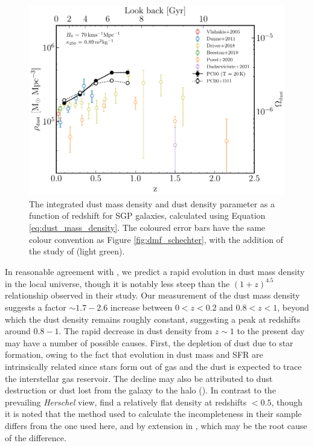 \begin{figure}
	\centering
	\includegraphics[width=0.8\columnwidth]{Figures/dmd.pdf}
	\caption[Integrated dust mass density as a function of redshift]{The integrated dust mass density and dust density parameter as a function of redshift for SGP galaxies, calculated using Equation \ref{eq:dust_mass_density}. The coloured error bars have the same colour convention as Figure \ref{fig:dmf_schechter}, with the addition of the study of \citealt{Driver_2018} (light green).}
	\label{fig:dmd}
\end{figure}

In reasonable agreement with \citealt{Dunne_2011}, we predict a rapid evolution in dust mass density in the local universe, though it is notably less steep than the $(1+z)^{4.5}$ relationship observed in their study. Our measurement of the dust mass density suggests a factor $\sim 1.7 - 2.6$ increase between $0 < z < 0.2$ and $0.8 < z < 1$, beyond which the dust density remains roughly constant, suggesting a peak at redshifts around $0.8 - 1$. The rapid decrease in dust density from $z \sim 1$ to the present day may have a number of possible causes. First, the depletion of dust due to star formation, owing to the fact that evolution in dust mass and SFR are intrinsically related since stars form out of gas and the dust is expected to trace the interstellar gas reservoir. The decline may also be attributed to dust destruction or dust lost from the galaxy to the halo (\citealt{Dunne_2011}). In contrast to the prevailing \textit{Herschel} view, \citealt{Driver_2018} find a relatively flat density at redshifts $< 0.5$, though it is noted that the method used to calculate the incompleteness in their sample differs from the one used here, and by extension in \citealt{Dunne_2011}, which may be the root cause of the difference.

